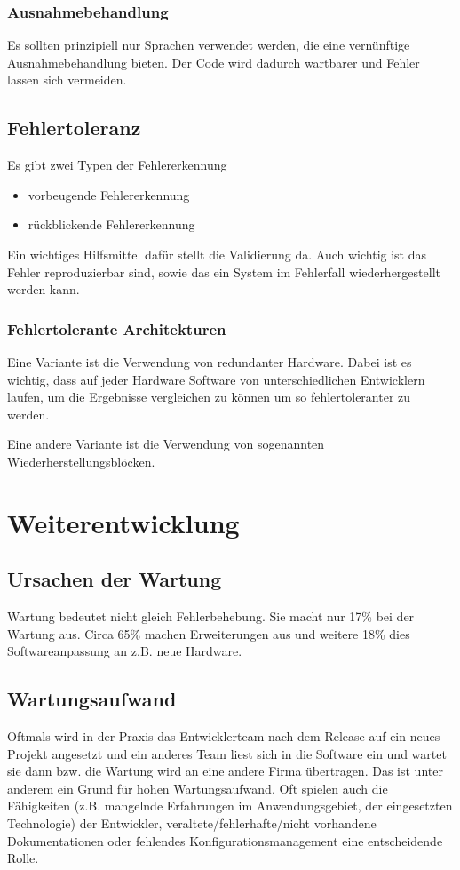 \subsubsection{Ausnahmebehandlung}
Es sollten prinzipiell nur Sprachen verwendet werden, die eine vernünftige Ausnahmebehandlung bieten. Der Code wird dadurch wartbarer und Fehler lassen sich vermeiden.

\subsection{Fehlertoleranz}
Es gibt zwei Typen der Fehlererkennung
\begin{itemize}
\item vorbeugende Fehlererkennung
\item rückblickende Fehlererkennung
\end{itemize}

Ein wichtiges Hilfsmittel dafür stellt die Validierung da. Auch wichtig ist das Fehler reproduzierbar sind, sowie das ein System im Fehlerfall wiederhergestellt werden kann.  


\subsubsection{Fehlertolerante Architekturen}
Eine Variante ist die Verwendung von redundanter Hardware. Dabei ist es wichtig, dass auf jeder Hardware Software von unterschiedlichen Entwicklern laufen, um die Ergebnisse vergleichen zu können um so fehlertoleranter zu werden.

Eine andere Variante ist die Verwendung von sogenannten Wiederherstellungsblöcken.

\section{Weiterentwicklung}
\subsection{Ursachen der Wartung}
Wartung bedeutet nicht gleich Fehlerbehebung. Sie macht nur 17\% bei der Wartung aus. Circa 65\% machen Erweiterungen aus und weitere 18\% dies Softwareanpassung an z.B. neue Hardware.

\subsection{Wartungsaufwand}
Oftmals wird in der Praxis das Entwicklerteam nach dem Release auf ein neues Projekt angesetzt und ein anderes Team liest sich in die Software ein und wartet sie dann bzw. die Wartung wird an eine andere Firma übertragen. Das ist unter anderem ein Grund für hohen Wartungsaufwand. Oft spielen auch die Fähigkeiten (z.B. mangelnde Erfahrungen im Anwendungsgebiet, der eingesetzten Technologie) der Entwickler, veraltete/fehlerhafte/nicht vorhandene Dokumentationen oder fehlendes Konfigurationsmanagement eine entscheidende Rolle.

